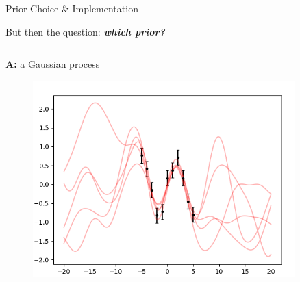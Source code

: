 \documentclass[9pt]{beamer}
\begin{document}
\begin{frame}{Prior Choice \& Implementation}
    \begin{center}
        But then the question: \textbf{\textit{which prior?}}
    \end{center}
    \begin{columns}
        \begin{column}{0.5\textwidth}
            \textbf{A:} a Gaussian process
            \begin{figure}
                \centering
                \includegraphics[width=0.9\textwidth]{sine6}
            \end{figure}


\end{column}
\end{columns}
\end{frame}
\end{document}
